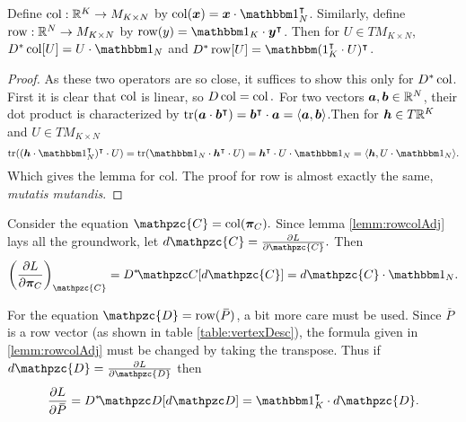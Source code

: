 \begin{lemm}\label{lemm:rowcolAdj}
	Define \( \operatorname{col}:\mathbb R^K\rightarrow M_{K\times N} \) by \( \op{col}(\bm x) = \bm x\cdot\mathbbm 1_N^{\intercal} \). Similarly, define \( \operatorname{row}:\mathbb R^N\rightarrow M_{K\times N} \) by  \( \op{row}(y) = \mathbbm 1_K\cdot \bm y^{\intercal} \). Then for \( U \in TM_{K\times N} \), \( D^{\ast}\op{col}[U] = U\cdot\mathbbm 1_N \) and \( D^{\ast}\op{row}[U] = \mathbbm (1_K^{\intercal}\cdot U)^{\intercal} \).
\end{lemm}

\begin{proof}
	As these two operators are so close, it suffices to show this only for \( D^{\ast}\operatorname{col} \). First it is clear that \( \operatorname{col} \) is linear, so \( D\operatorname{col} = \operatorname{col}. \) 	
	For two vectors \(\bm a,\bm b\in\mathbb R^N \), their dot product is characterized by \( \operatorname{tr}(\bm a\cdot \bm b^{\intercal}) = \bm b^{\intercal}\cdot \bm a = \langle\bm a,\bm b\rangle \).Then for \( \bm h\in T\mathbb R^K \) and \( U\in TM_{K\times N} \)
	\begin{equation}
		\op{tr}((\bm h\cdot\mathbbm 1_N^{\intercal})^{\intercal}\cdot U) = \op{tr}(\mathbbm 1_N\cdot \bm h^{\intercal}\cdot U) = \bm h^{\intercal}\cdot U\cdot\mathbbm 1_N = \<\bm h,U\cdot\mathbbm 1_N\>.
	\end{equation}
	Which gives the lemma for col. The proof for row is almost exactly the same, \textit{mutatis mutandis}.
\end{proof}

\begin{calc}[Adjoint \#3 \& \#4]
	Consider the equation \(\mathpzc{C} = \op{col}(\bm\pi_C).\) Since lemma \ref{lemm:rowcolAdj} lays all the groundwork, let \( d\mathpzc{C} = \pdv{L}{\mathpzc{C}}. \) Then
	\begin{equation}\label{eqn:gradcalc5}
	\left(\pdv{L}{\bm\pi_{C}}\right)_{\mathpzc{C}} = D^{\ast}\!\mathpzc C[d\mathpzc{C}]= d\mathpzc{C}\cdot\mathbbm 1_N.
	\end{equation}
	
	For the equation \( \mathpzc{D}=\op{row}(\,\overbar{\!P}) \), a bit more care must be used.  Since \( \overbar{\!P} \) is a row vector (as shown in table \ref{table:vertexDesc}), the formula given in \ref{lemm:rowcolAdj} must be changed by taking the transpose.  Thus if \( d\mathpzc{D} = \pdv{L}{\mathpzc{D}} \) then
	\begin{equation}\label{eqn:gradcalc6}
		\pdv{L}{\,\overbar{\!P}} =D^{\ast}\!\mathpzc D[d\mathpzc D] =\mathbbm 1_K^{\intercal}\cdot d\mathpzc{D}.
	\end{equation}
\end{calc}

